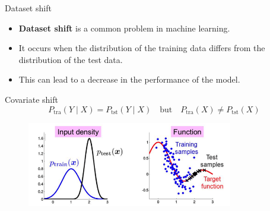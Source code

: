 \begin{frame}{Dataset shift}
	\begin{itemize}
		\item \textbf{Dataset shift} is a common problem in machine learning.
		
		\item It occurs when the distribution of the training data differs from the distribution of the test data.
		
		\item This can lead to a decrease in the performance of the model.
	\end{itemize}
		
\end{frame} 


\begin{frame}{Covariate shift}
	\vspace{0.3cm}
	\[	P_{\text{tra}}(Y \mid X) = P_{\text{tst}}(Y \mid X) \quad \text{but} \quad P_{\text{tra}}(X) \neq P_{\text{tst}}(X)	\]
	
	\begin{figure}[H]
		\centering
		\includegraphics[width=9cm]{../assets/immagine.png}
		\label{fig:immagine}
	\end{figure}
\end{frame}

